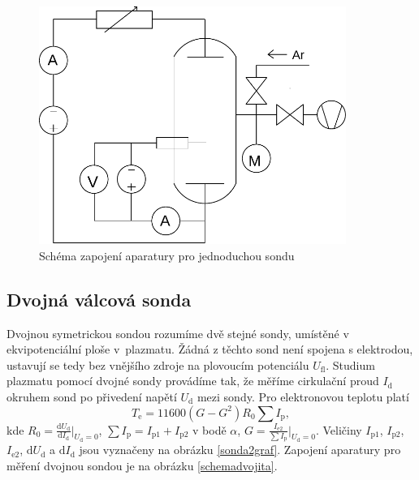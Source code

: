 \documentclass[12pt]{article}
\begin{document}
\begin{figure}[htbp]
\begin{center}
\includegraphics[width=10cm]{schemajednoducha.pdf}
\caption{Schéma zapojení aparatury pro jednoduchou sondu}
\label{schemajednoducha}
\end{center}
\end{figure}

\subsection{Dvojná válcová sonda}
Dvojnou symetrickou sondou rozumíme dvě stejné sondy, umístěné v ekvipotenciální ploše v~plaz\-ma\-tu. Žádná z těchto sond není spojena s elektrodou, ustavují se tedy bez vnějšího zdroje na plovoucím potenciálu $U_\mathrm{fl}$. Studium plazmatu pomocí dvojné sondy provádíme tak, že měříme cirkulační proud $I_\mathrm{d}$ okruhem sond po přivedení napětí $U_\mathrm{d}$ mezi sondy. Pro elektronovou teplotu platí
\begin{equation}
T_\mathrm{e} = 11600 (G - G^2) R_0 \sum{I_\mathrm{p}} \mathrm{,}
\end{equation} 
kde $R_0 = \frac{\mathrm{d}U_\mathrm{d}}{\mathrm{d}I_\mathrm{d}}|_{U_\mathrm{d}=0}$, $\sum{I_\mathrm{p}} = I_\mathrm{p1} + I_\mathrm{p2}$ v bodě $\alpha$, $G = \frac{I_\mathrm{e2}}{\sum{I_\mathrm{p}}}|_{U_\mathrm{d}=0}$. Veličiny $I_\mathrm{p1}$, $I_\mathrm{p2}$, $I_\mathrm{e2}$, $\mathrm{d}U_\mathrm{d}$ a $\mathrm{d}I_\mathrm{d}$ jsou vyznačeny na obrázku \ref{sonda2graf}. Zapojení aparatury pro měření dvojnou sondou je na obrázku \ref{schemadvojita}.
\end{document}
